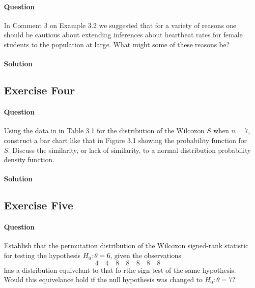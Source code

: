 \documentclass[]{article}
\let\oldparagraph\paragraph
\renewcommand{\paragraph}[1]{\oldparagraph{#1}\mbox{}}
\begin{document}
\paragraph{Question}\label{question-2}

In Comment 3 on Example 3.2 we suggested that for a variety of reasons
one should be cautious about extending inferences about heartbeat rates
for female students to the population at large. What might some of these
reasons be?

\paragraph{Solution}\label{solution-2}

\subsection{Exercise Four}\label{exercise-four}

\paragraph{Question}\label{question-3}

Using the data in in Table 3.1 for the distribution of the Wilcoxon
\(S\) when \(n = 7\), construct a bar chart like that in Figure 3.1
showing the probability function for \(S\). Discuss the similarity, or
lack of similarity, to a normal distribution probability density
function.

\paragraph{Solution}\label{solution-3}

\subsection{Exercise Five}\label{exercise-five}

\paragraph{Question}\label{question-4}

Establish that the permutation distribution of the Wilcoxon signed-rank
statistic for testing the hypothesis \(H_0: \theta = 6\), given the
observations \[4\quad4\quad8\quad8\quad8\quad8\quad8\] has a
distribution equivelant to that fo rthe sign test of the same
hypothesis. Would this equivelance hold if the null hypothesis was
changed to \(H_0: \theta = 7\)?
\end{document}
